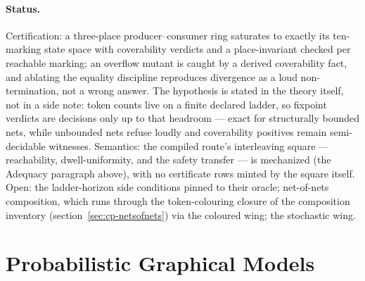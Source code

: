 \paragraph{Status.} Certification: a three-place producer--consumer
ring saturates to exactly its ten-marking state space with
coverability verdicts and a place-invariant checked per reachable
marking; an overflow mutant is caught by a derived coverability fact,
and ablating the equality discipline reproduces divergence as a loud
non-termination, not a wrong answer. The hypothesis is stated in
the theory itself, not in a side note: token counts live on a finite declared ladder,
so fixpoint verdicts are decisions only up to that headroom --- exact
for structurally bounded nets, while unbounded nets refuse loudly and
coverability positives remain semi-decidable witnesses. Semantics:
the compiled route's interleaving square --- reachability,
dwell-uniformity, and the safety transfer --- is mechanized (the
Adequacy paragraph above), with no certificate rows minted by the
square itself. Open: the
ladder-horizon side conditions pinned to their oracle; net-of-nets
composition, which runs through the token-colouring closure of the
composition inventory (section~\ref{sec:cp-netsofnets}) via the
coloured wing; the stochastic wing.



\section{Probabilistic Graphical Models}
\label{sec:mt-pgm}

